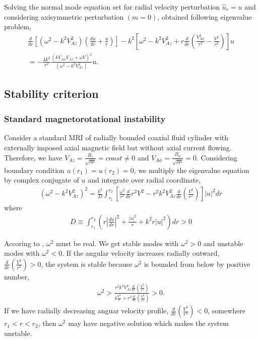 \documentclass{jfm}
\begin{document}
Solving the normal mode equation set for radial velocity perturbation 
$\hat{u}_r = u$ and considering axisymmetric perturbation $(m=0)$, \cite{Acheson1973a} obtained following eigenvalue problem,
\begin{align}
    \frac{d}{dr}\left[(\omega^2-k^2 V_{Az}^2)\left(\frac{du}{dr}+\frac{u}{r}\right)\right]-k^2\left[\omega^2-k^2 V_{Az}^2+r\frac{d}{dr}\left(\frac{V_{A\phi}^2}{r^2}-\frac{V^2}{r^2}\right)\right]u \nonumber \\
    = -\frac{4 k^2}{r^2}\frac{(k V_{A\phi} V_{Az}+\omega V)^2}{(\omega^2-k^2 V_{Az}^2)} u.
\end{align}


%
%
\subsection{Stability criterion}

\subsubsection{Standard magnetorotational instability}

Consider a standard MRI of radially bounded coaxial fluid cylinder with 
externally imposed axial magnetic field but without axial current flowing. 
Therefore, we have $V_{Az}=\frac{B_z}{\sqrt{\rho\mu}}=const \neq 0$ and 
$V_{A\phi}=\frac{B_\phi}{\sqrt{\rho\mu}}=0$. Considering boundary condition 
$u(r_1)=u(r_2)=0$, we multiply the eigenvalue equation by complex conjugate 
of $u$ and integrate over radial coordinate,
\begin{align}
    (\omega^2-k^2 V_{Az}^2)^2 = \frac{k^2}{D}\int_{r_1}^{r_2}\left[\frac{\omega^2}{r^2}\frac{d}{dr}r^2V^2 -r^2 k^2 V_{Az}^2 \frac{d}{dr}\left(\frac{V^2}{r^2}\right)\right]|u|^2 dr
\end{align}   
where 
\begin{align}
    D\equiv \int_{r_1}^{r_2}\left(r \left|\frac{du}{dr}\right|^2 +\frac{|u|^2}{r}+k^2 r |u|^2 \right) dr >0
\end{align}

Accoring to \cite{Chandrasekhar1960}, $\omega^2$ must be real. We get stable 
modes with $\omega^2>0$ and unstable modes with $\omega^2<0$. If the angular 
velocity increases radially outward, $\frac{d}{dr}\left(\frac{V^2}{r^2}\right)>0$, 
the system is stable because $\omega^2$ is bounded from below by positive number, 
\begin{align}
    \omega^2>\frac{r^2k^2 V_{Az}^2 \frac{d}{dr}\left(\frac{V^2}{r^2}\right)}{4\frac{V^2}{r}+r^2\frac{d}{dr}\left(\frac{V^2}{r^2}\right)}>0.
\end{align}
If we have radially decreasing anguar velocity profile, 
$\frac{d}{dr}\left(\frac{V^2}{r^2}\right)<0$, somewhere $r_1<r<r_2$, then 
$\omega^2$ may have negative solution which makes the system unstable.
\end{document}
